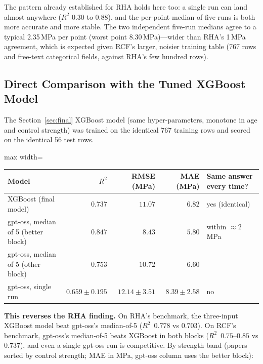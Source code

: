 \documentclass[11pt]{article}
\newcommand{\R}{$R^2$}
\begin{document}
\noindent The pattern already established for RHA holds here too: a single run can land
almost anywhere (\R{} $0.30$ to $0.88$), and the per-point median of five runs is both
more accurate and more stable. The two independent five-run medians agree to a typical
2.35\,MPa per point (worst point 8.30\,MPa)---wider than RHA's 1\,MPa agreement, which is
expected given RCF's larger, noisier training table (767 rows and free-text categorical
fields, against RHA's few hundred rows).

\subsection{Direct Comparison with the Tuned XGBoost Model}
\label{sec:p2-direct}
The Section~\ref{sec:final} XGBoost model (same hyper-parameters, monotone in age and
control strength) was trained on the identical 767 training rows and scored on the
identical 56 test rows.

\begin{center}\small
\begin{adjustbox}{max width=\linewidth}
\begin{tabular}{lrrrl}
\toprule
Model & \R{} & RMSE (MPa) & MAE (MPa) & Same answer every time? \\
\midrule
XGBoost (final model) & $0.737$ & $11.07$ & $6.82$ & yes (identical) \\
\rowcolor{green!12}gpt-oss, median of 5 (better block) & $\mathbf{0.847}$ & $\mathbf{8.43}$ & $\mathbf{5.80}$ & within $\approx2$\,MPa \\
gpt-oss, median of 5 (other block) & $0.753$ & $10.72$ & $6.60$ & \\
gpt-oss, single run & $0.659\pm0.195$ & $12.14\pm3.51$ & $8.39\pm2.58$ & no \\
\bottomrule
\end{tabular}
\end{adjustbox}
\end{center}

\noindent \textbf{This reverses the RHA finding.} On RHA's benchmark, the three-input
XGBoost model beat gpt-oss's median-of-5 (\R{}~$0.778$ vs $0.703$). On RCF's benchmark,
gpt-oss's median-of-5 beats XGBoost in both blocks (\R{}~$0.75$--$0.85$ vs $0.737$), and
even a single gpt-oss run is competitive. By strength band (papers sorted by control
strength; MAE in MPa, gpt-oss column uses the better block):
\end{document}
